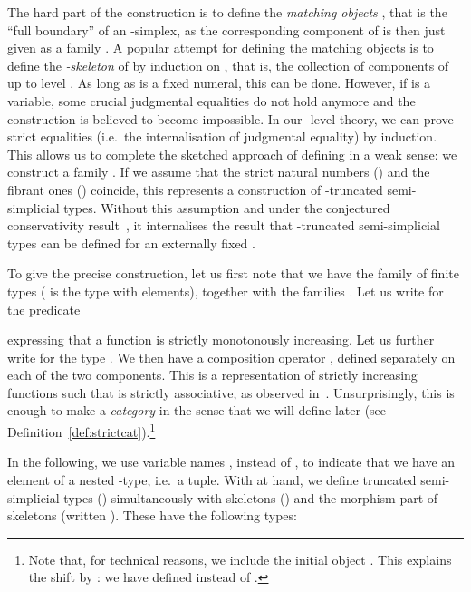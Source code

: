 \documentclass[a4paper,reqno]{amsart}
\theoremstyle{plain}
\theoremstyle{definition}
\begin{document}
The hard part of the construction is to define the \emph{matching objects} , that is the ``full boundary'' of an -simplex, as the corresponding component of  is then just given as a family .
A popular attempt for defining the matching objects  is to define the \emph{-skeleton}  of  by induction on , that is, the collection of components of  up to level .
As long as  is a fixed numeral, this can be done.
However, if  is a variable, some crucial judgmental equalities do not hold anymore
and the construction is believed to become impossible.
In our -level theory, we can prove strict equalities (i.e.\ the internalisation of judgmental equality) by induction.
This allows us to complete the sketched approach of defining  in a weak sense:
we construct a family . 
If we assume that the strict natural numbers () and the fibrant ones () coincide, this represents a construction of -truncated semi-simplicial types.
Without this assumption and under the conjectured conservativity result~\cite{paolo:thesis},
it internalises the result that -truncated semi-simplicial types can be defined for an externally fixed .

To give the precise construction, let us first note that we have the family  of finite types ( is the type with  elements), together with the families .
Let us write  for the predicate 
 
expressing that a function is strictly monotonously increasing.
Let us further write  for the type .
We then have a composition operator , defined separately on each of the two components.
This is a representation of strictly increasing functions such that  is strictly associative, as observed in~\cite{nicolai:thesis}.
Unsurprisingly, this is enough to make  a \emph{category} in the sense that we will define later (see Definition~\ref{def:strictcat}).\footnote{Note that, for technical reasons, we include the initial object . This explains the shift by : we have defined  instead of .}


In the following, we use variable names ,  instead of ,  to indicate that we have an element of a nested -type, i.e.\ a tuple.
With  at hand, we define truncated semi-simplicial types () simultaneously with skeletons () and the morphism part of skeletons (written ).
These have the following types:
\end{document}
